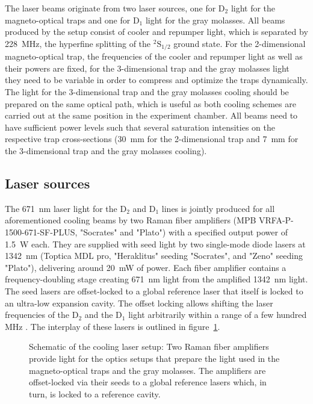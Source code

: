 The laser beams originate from two laser sources, one for D$_2$ light for the magneto-optical traps and one for D$_1$ light for the gray molasses. All beams produced by the setup consist of cooler and repumper light, which is separated by \SI{228}{\mega\hertz}, the hyperfine splitting of the $^2\text{S}_{1/2}$ ground state. For the 2-dimensional magneto-optical trap, the frequencies of the cooler and repumper light as well as their powers are fixed, for the 3-dimensional trap and the gray molasses light they need to be variable in order to compress and optimize the traps dynamically. The light for the 3-dimensional trap and the gray molasses cooling should be prepared on the same optical path, which is useful as both cooling schemes are carried out at the same position in the experiment chamber. All beams need to have sufficient power levels such that several saturation intensities on the respective trap cross-sections (\SI{30}{\milli\meter} for the 2-dimensional trap and \SI{7}{\milli\meter} for the 3-dimensional trap and the gray molasses cooling).

\subsection*{Laser sources}
The \SI{671}{\nano\meter} laser light for the D$_2$ and D$_1$ lines is jointly produced for all aforementioned cooling beams by two Raman fiber amplifiers (MPB VRFA-P-1500-671-SF-PLUS, "Socrates" and "Plato") with a specified output power of \SI{1.5}{\watt} each. They are supplied with seed light by two single-mode diode lasers at \SI{1342}{\nano\meter} (Toptica MDL pro, "Heraklitus" seeding "Socrates", and "Zeno" seeding "Plato"), delivering around \SI{20}{\milli\watt} of power. Each fiber amplifier contains a frequency-doubling stage creating \SI{671}{\nano\meter} light from the amplified \SI{1342}{\nano\meter} light. The seed lasers are offset-locked to a global reference laser that itself is locked to an ultra-low expansion cavity. The offset locking allows shifting the laser frequencies of the D$_2$ and the D$_1$ light arbitrarily within a range of a few hundred \si{\mega\hertz} . The interplay of these lasers is outlined in figure~\ref{fig:laser_interplay_schematic}.

\begin{figure}
    \caption{Schematic of the cooling laser setup: Two Raman fiber amplifiers provide light for the optics setups that prepare the light used in the magneto-optical traps and the gray molasses. The amplifiers are offset-locked via their seeds to a global reference lasers which, in turn, is locked to a reference cavity.
    }\label{fig:laser_interplay_schematic}
\end{figure}


